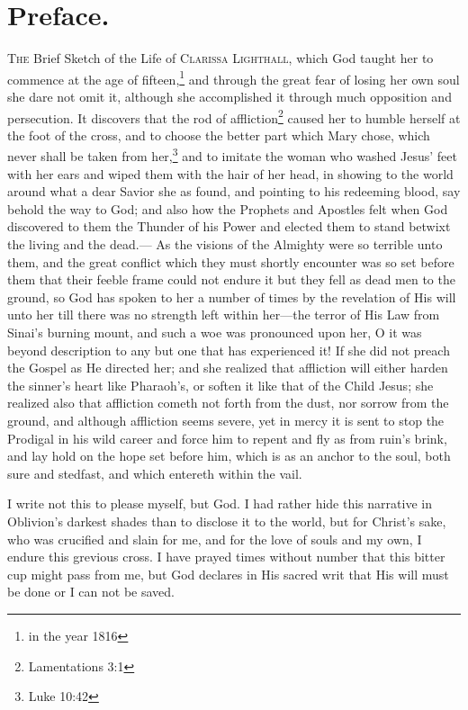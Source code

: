 \section*{Preface.}
\textsc{The} Brief Sketch of the Life of \textsc{Clarissa Lighthall}, which God taught her to commence at the age of fifteen,\footnote{in the year 1816} and through the great fear of losing her own soul she dare not omit it, although she accomplished it through much opposition and persecution.
It discovers that the rod of affliction\footnote{Lamentations 3:1} caused her to humble herself at the foot of the cross, and to choose the better part which Mary chose, which never shall be taken from her,\footnote{Luke 10:42} and to imitate the woman who washed Jesus' feet with her ears and wiped them with the hair of her head, in showing to the world around what a dear Savior she as found, and pointing to his redeeming blood, say behold the way to God; and also how the Prophets and Apostles felt when God discovered to them the Thunder of his Power and elected them to stand betwixt the living and the dead.---%
As the visions of the Almighty were so terrible unto them, and the great conflict which they must shortly encounter was so set before them that their feeble frame could not endure it but they fell as dead men to the ground, so God has spoken to her a number of times by the revelation of His will unto her till there was no strength left within her---the terror of His Law from Sinai's burning mount, and such a woe was pronounced upon her, O it was beyond description to any but one that has experienced it!
If she did not preach the Gospel as He directed her; and she realized that affliction will either harden the sinner's heart like Pharaoh's, or soften it like that of the Child Jesus; she realized also that affliction cometh not forth from the dust, nor sorrow from the ground, and although affliction seems severe, yet in mercy it is sent to stop the Prodigal in his wild career and force him to repent and fly as from ruin's brink, and lay hold on the hope set before him, which is as an anchor to the soul, both sure and stedfast, and which entereth within the vail.

I write not this to please myself, but God.
I had rather hide this narrative in Oblivion's darkest shades than to disclose it to the world, but for Christ's sake, who was crucified and slain for me, and for the love of souls and my own, I endure this grevious cross.
I have prayed times without number that this bitter cup might pass from me, but God declares in His sacred writ that His will must be done or I can not be saved.

